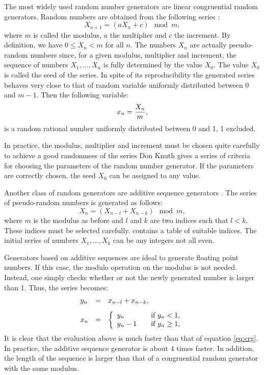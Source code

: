  The most widely
used random number generators are linear congruential random
generators. Random numbers are obtained from the following series
\cite{Knuth2}:
\begin{equation}
\label{eq:crg}
  X_{n+1} = \left(aX_n+c\right) \mod m,
\end{equation}
where $m$ is called the modulus, $a$ the multiplier and $c$ the
increment. By definition, we have $0\leq X_n<m$ for all $n$. The
numbers $X_n$ are actually pseudo-random numbers since, for a
given modulus, multiplier and increment, the sequence of numbers
$X_1,\ldots,X_n$ is fully determined by the value $X_0$. The value
$X_0$ is called the seed of the series. In spite of its
reproducibility the generated series behaves very close to that of
random variable uniformly distributed between 0 and $m-1$. Then
the following variable:
\begin{equation}
  x_n = {X_n \over m},
\end{equation}
is a random rational number uniformly distributed between 0 and 1,
1 excluded.

In practice, the modulus, multiplier and increment must be chosen
quite carefully to achieve a good randomness of the series
Don Knuth \cite{Knuth2} gives a series of criteria for choosing the
parameters of the random number generator.
If the parameters are correctly chosen, the seed $X_0$ can be assigned to any value.

 Another class of random
generators are additive sequence generators \cite{Knuth2}. The
series of pseudo-random numbers is generated as follows:
\begin{equation}
  X_n = \left(X_{n-l}+X_{n-k}\right) \mod m,
\end{equation}
where $m$ is the modulus as before and $l$ and $k$ are two indices
such that $l<k$.
These indices must be selected carefully.
\cite{Knuth2} contains a table of suitable indices. The initial
series of numbers $X_1,\ldots,X_k$ can be any integers not all
even.

Generators based on additive sequences are ideal to generate
floating point numbers. If this case, the modulo operation on the
modulus is not needed. Instead, one simply checks whether or not
the newly generated number is larger than 1. Thus, the series
becomes:
\begin{equation}
\label{eq:addseqrandom}
  \begin{array}{lcl}
  y_n&=&x_{n-l}+x_{n-k},\\*[2ex]
  x_n&=&\left\{
    \begin{array}{ll}
    y_n&\mbox{\quad if $y_n<1$,}\\
    y_n-1&\mbox{\quad if $y_n\geq 1$,}\\
    \end{array}
  \right.
  \end{array}
\end{equation}
It is clear that the evaluation above is much faster than that of
equation \ref{eq:crg}. In practice, the additive sequence
generator is about 4 times faster. In addition, the length of the
sequence is larger than that of a  congruential random generator
with the same modulus.

